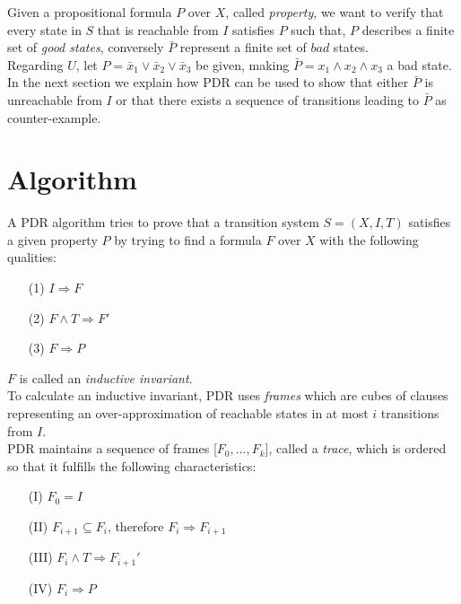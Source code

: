 \documentclass[11pt, a4paper, BCOR=10mm, ngerman]{scrbook}
\begin{document}
Given a propositional formula $P$ over $X$, called \textsl{property}, we want
to verify that every state in $S$ that is reachable from
$I$ satisfies $P$ such that, $P$ describes a finite set of \textsl{good states}, conversely $\bar P$ represent a finite set of $bad$ states.  \\ 
Regarding $U$, let $P = \bar x_1 \lor \bar x_2 \lor \bar x_3$ be given, making $\bar P = x_1 \land x_2 \land x_3$ a bad state. \\ 
In the next section we explain how PDR can be used to show that either $\bar P$ is unreachable from $I$ or that there exists a sequence of transitions leading to $\bar P$ as counter-example.

\section{Algorithm}
A PDR algorithm tries to prove that a transition system $S = (X, I, T)$ satisfies a given property $P$ by trying to find a formula $F$ over $X$ with the following qualities:
\begin{itemize}
\item[(1)] $I \Rightarrow F$
\item[(2)] $F \land T \Rightarrow F'$
\item[(3)] $F \Rightarrow P$
\end{itemize}
$F$ is called an \textsl{inductive invariant}. \\ 
To calculate an inductive invariant, PDR uses \textsl{frames} which are cubes of clauses representing an over-approximation of reachable states in at most $i$ transitions from $I$. \\
PDR maintains a sequence of frames [$F_0, ..., F_k$], called a \textsl{trace}, which is ordered so that it fulfills the following characteristics: 

\begin{itemize}
\item[(I)] $F_0 = I$
\item[(II)] $F_{i+1} \subseteq F_{i}$, therefore $F_i \Rightarrow F_{i+1}$
\item[(III)] $F_i \land T \Rightarrow F_{i+1}'$
\item[(IV)] $F_i \Rightarrow P$
\end{itemize}
\end{document}
